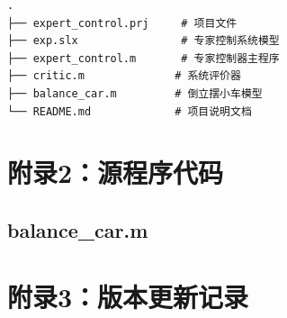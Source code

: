 \documentclass[12pt,a4paper,UTF8]{article}
\begin{document}
\begin{lstlisting}
.
├── expert_control.prj     # 项目文件
├── exp.slx                # 专家控制系统模型
├── expert_control.m       # 专家控制器主程序
├── critic.m              # 系统评价器
├── balance_car.m         # 倒立摆小车模型
└── README.md             # 项目说明文档
\end{lstlisting}



\section{附录2：源程序代码}
\subsection{balance\_car.m}
\section{附录3：版本更新记录}
\end{document}
